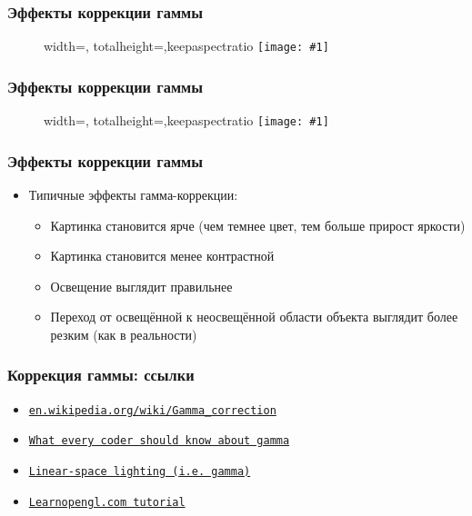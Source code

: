 \documentclass{beamer}
\newcommand{\slideimage}[1]{
  \begin{figure}
    \begin{adjustbox}{width=\textwidth, totalheight=\textheight-2\baselineskip-2\baselineskip,keepaspectratio}
      \texttt{[image: \#1]}
    \end{adjustbox}
  \end{figure}
}
\begin{document}
\begin{frame}[fragile]
\frametitle{Эффекты коррекции гаммы}
\slideimage{gamma-ex2.png}
\end{frame}

\begin{frame}[fragile]
\frametitle{Эффекты коррекции гаммы}
\slideimage{gamma-ex3.png}
\end{frame}

\begin{frame}[fragile]
\frametitle{Эффекты коррекции гаммы}
\begin{itemize}
\item Типичные эффекты гамма-коррекции:
\pause
\begin{itemize}
\item Картинка становится ярче (чем темнее цвет, тем больше прирост яркости)
\pause
\item Картинка становится менее контрастной
\pause
\item Освещение выглядит правильнее
\pause
\item Переход от освещённой к неосвещённой области объекта выглядит более резким (как в реальности)
\end{itemize}
\end{itemize}
\end{frame}

\begin{frame}[fragile]
\frametitle{Коррекция гаммы: ссылки}
\begin{itemize}
\item \href{https://en.wikipedia.org/wiki/Gamma_correction}{\nolinkurl{en.wikipedia.org/wiki/Gamma\_correction}}
\item \href{http://blog.johnnovak.net/2016/09/21/what-every-coder-should-know-about-gamma}{\nolinkurl{What every coder should know about gamma}}
\item \href{http://filmicworlds.com/blog/linear-space-lighting-i-e-gamma}{\nolinkurl{Linear-space lighting (i.e. gamma)}}
\item \href{https://learnopengl.com/Advanced-Lighting/Gamma-Correction}{\nolinkurl{Learnopengl.com tutorial}}
\end{itemize}
\end{frame}
\end{document}
